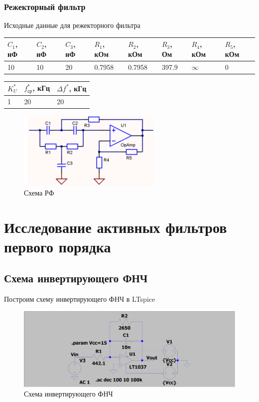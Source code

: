 \documentclass[a4paper, 12pt]{article}
\begin{document}
    \subsubsection{Режекторный фильтр} \label{sec:rectoring}
    Исходные данные для режекторного фильтра
    \begin{center}
        \begin{tabular}{ | m{3.5em} | m{3.5em}| m{3.5em} | m{4em} | m{4em} | m{3.5em} | m{4em} | m{4em} |} 
        \hline
        $C_1$, нФ&$C_2$, нФ&$C_3$, нФ&$R_1$, кОм&$R_2$, кОм&$R_3$, Ом &$R_4$, кОм&$R_5$, кОм\\ 
        \hline
        10&10&20&0.7958&0.7958&397.9&$\infty$&0\\ 
        \hline
        \end{tabular}
    \end{center}
    \begin{center}
        \begin{tabular}{ | m{3.5em} | m{3.5em}| m{4.5em} |} 
        \hline
        $K_U^*$&$f_\text{ср}^*$, кГц&$\Delta f^*$, кГц\\ 
        \hline
        1&20&20\\ 
        \hline
        \end{tabular}
    \end{center}
    \begin{figure}[H]
        \centering
        \includegraphics{rectoring.png}
        \captionsetup{skip=0pt}
        \caption{Схема РФ}
        \label{fig:null_scheme5}
    \end{figure}


    \section{Исследование активных фильтров первого порядка}
    \subsection{Схема инвертирующего ФНЧ}
    Построим схему инвертирующего ФНЧ в LTspice
    \begin{figure}[H]
        \centering
        \includegraphics[scale=0.22]{scheme1.png}
        \captionsetup{skip=0pt}
        \caption{Схема инвертирующего ФНЧ}
        \label{fig:scheme1}
    \end{figure}
\end{document}
